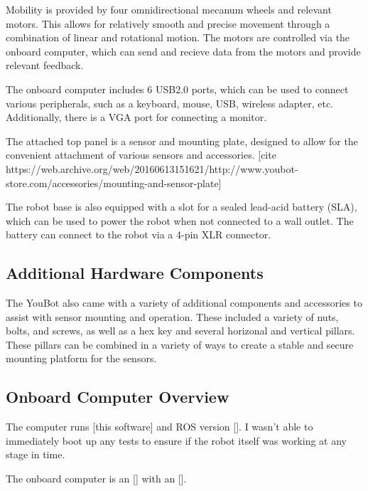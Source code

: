 \documentclass[a4paper, 12pt]{article}
\newif\ifshownotes
\newcommand{\notes}[1]{\ifshownotes\textcolor{blue}{#1}\fi}
\begin{document}
    Mobility is provided by four omnidirectional mecanum wheels and relevant motors. This allows for relatively smooth and precise movement through a combination of linear and rotational motion. The motors are controlled via the onboard computer, which can send and recieve data from the motors and provide relevant feedback.

    The onboard computer includes 6 USB2.0 ports, which can be used to connect various peripherals, such as a keyboard, mouse, USB, wireless adapter, etc. Additionally, there is a VGA port for connecting a monitor. \cite{githubYoubotOverview}  

    The attached top panel is a sensor and mounting plate, designed to allow for the convenient attachment of various sensors and accessories. [cite https://web.archive.org/web/20160613151621/http://www.youbot-store.com/accessories/mounting-and-sensor-plate]

    The robot base is also equipped with a slot for a sealed lead-acid battery (SLA), which can be used to power the robot when not connected to a wall outlet. The battery can connect to the robot via a 4-pin XLR connector.  

    \subsection{Additional Hardware Components}

    
    \notes{DESCRIBE THE INITIAL INSPECTION IN FULL HERE! TALK ABOUT THE PILLAR STUFF AND NUTS AND WHATNOT AS WELL!!!!}

    The YouBot also came with a variety of additional components and accessories to assist with sensor mounting and operation. These included a variety of nuts, bolts, and screws, as well as a hex key and several horizonal and vertical pillars. These pillars can be combined in a variety of ways to create a stable and secure mounting platform for the sensors. 

    \subsection{Onboard Computer Overview}
    The computer runs [this software] and ROS version []. I wasn't able to immediately boot up any tests to ensure if the robot itself was working at any stage in time. 

    \notes{what ports are there? what software is on there? ubuntu? initial setup? ROS version? software?}
    The onboard computer is an [] with an []. 
\end{document}
